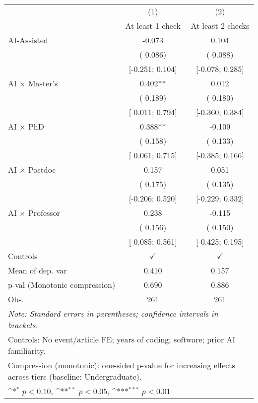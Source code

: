 \def\sym#1{\ifmmode^{#1}\else\(^{#1}\)\fi}
\begin{tabular}{l*{2}{c}}
\hline\hline
 & (1) & (2)
\\
 & At least 1 check & At least 2 checks
 \\
\hline
AI-Assisted & -0.073 &  0.104
\\
 & ( 0.086) & ( 0.088)
\\
 & [-0.251;  0.104] & [-0.078;  0.285]
\\
AI × Master's &  0.402** &  0.012
\\
 & ( 0.189) & ( 0.180)
\\
 & [ 0.011;  0.794] & [-0.360;  0.384]
\\
AI × PhD &  0.388** & -0.109
\\
 & ( 0.158) & ( 0.133)
\\
 & [ 0.061;  0.715] & [-0.385;  0.166]
\\
AI × Postdoc &  0.157 &  0.051
\\
 & ( 0.175) & ( 0.135)
\\
 & [-0.206;  0.520] & [-0.229;  0.332]
\\
AI × Professor &  0.238 & -0.115
\\
 & ( 0.156) & ( 0.150)
\\
 & [-0.085;  0.561] & [-0.425;  0.195]
\\
\hline
Controls & $\checkmark$ & $\checkmark$
\\
Mean of dep. var &  0.410 &  0.157
\\
p-val (Monotonic compression) &  0.690 &  0.886
\\
Obs. & 261 & 261
\\
\hline
\hline\hline
\multicolumn{3}{l}{\it{Note:} Standard errors in parentheses; confidence intervals in brackets.}\\
\multicolumn{3}{l}{Controls: No event/article FE; years of coding; software; prior AI familiarity.}\\
\multicolumn{3}{l}{Compression (monotonic): one-sided p-value for increasing effects across tiers (baseline: Undergraduate).}\\
\multicolumn{3}{l}{\sym{*} $p<0.10$, \sym{**} $p<0.05$,  \sym{***} $p<0.01$}\\
\end{tabular}
